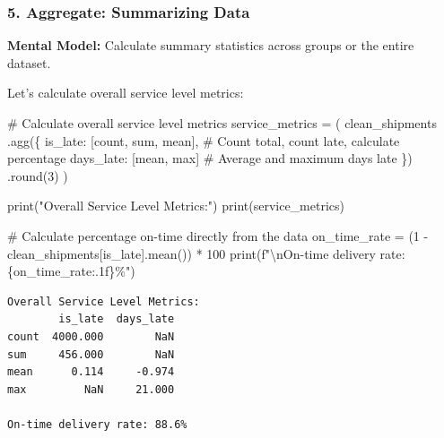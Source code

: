 \documentclass[
  letterpaper,
  DIV=11,
  numbers=noendperiod]{scrartcl}
\newenvironment{Shaded}{\begin{snugshade}}{\end{snugshade}}
\newcommand{\BuiltInTok}[1]{\textcolor[rgb]{0.00,0.23,0.31}{#1}}
\newcommand{\CharTok}[1]{\textcolor[rgb]{0.13,0.47,0.30}{#1}}
\newcommand{\CommentTok}[1]{\textcolor[rgb]{0.37,0.37,0.37}{#1}}
\newcommand{\DecValTok}[1]{\textcolor[rgb]{0.68,0.00,0.00}{#1}}
\newcommand{\NormalTok}[1]{\textcolor[rgb]{0.00,0.23,0.31}{#1}}
\newcommand{\OperatorTok}[1]{\textcolor[rgb]{0.37,0.37,0.37}{#1}}
\newcommand{\SpecialCharTok}[1]{\textcolor[rgb]{0.37,0.37,0.37}{#1}}
\newcommand{\SpecialStringTok}[1]{\textcolor[rgb]{0.13,0.47,0.30}{#1}}
\newcommand{\StringTok}[1]{\textcolor[rgb]{0.13,0.47,0.30}{#1}}
\begin{document}
\subsubsection{5. Aggregate: Summarizing
Data}\label{aggregate-summarizing-data}

\textbf{Mental Model:} Calculate summary statistics across groups or the
entire dataset.

Let's calculate overall service level metrics:

\label{mental-model-5-aggregate}
\begin{Shaded}
\begin{Highlighting}[]
\CommentTok{\# Calculate overall service level metrics}
\NormalTok{service\_metrics }\OperatorTok{=}\NormalTok{ (}
\NormalTok{    clean\_shipments}
\NormalTok{    .agg(\{}
        \StringTok{\textquotesingle{}is\_late\textquotesingle{}}\NormalTok{: [}\StringTok{\textquotesingle{}count\textquotesingle{}}\NormalTok{, }\StringTok{\textquotesingle{}sum\textquotesingle{}}\NormalTok{, }\StringTok{\textquotesingle{}mean\textquotesingle{}}\NormalTok{],  }\CommentTok{\# Count total, count late, calculate percentage}
        \StringTok{\textquotesingle{}days\_late\textquotesingle{}}\NormalTok{: [}\StringTok{\textquotesingle{}mean\textquotesingle{}}\NormalTok{, }\StringTok{\textquotesingle{}max\textquotesingle{}}\NormalTok{]  }\CommentTok{\# Average and maximum days late}
\NormalTok{    \})}
\NormalTok{    .}\BuiltInTok{round}\NormalTok{(}\DecValTok{3}\NormalTok{)}
\NormalTok{)}

\BuiltInTok{print}\NormalTok{(}\StringTok{"Overall Service Level Metrics:"}\NormalTok{)}
\BuiltInTok{print}\NormalTok{(service\_metrics)}

\CommentTok{\# Calculate percentage on{-}time directly from the data}
\NormalTok{on\_time\_rate }\OperatorTok{=}\NormalTok{ (}\DecValTok{1} \OperatorTok{{-}}\NormalTok{ clean\_shipments[}\StringTok{\textquotesingle{}is\_late\textquotesingle{}}\NormalTok{].mean()) }\OperatorTok{*} \DecValTok{100}
\BuiltInTok{print}\NormalTok{(}\SpecialStringTok{f"}\CharTok{\textbackslash{}n}\SpecialStringTok{On{-}time delivery rate: }\SpecialCharTok{\{}\NormalTok{on\_time\_rate}\SpecialCharTok{:.1f\}}\SpecialStringTok{\%"}\NormalTok{)}
\end{Highlighting}
\end{Shaded}

\begin{verbatim}
Overall Service Level Metrics:
        is_late  days_late
count  4000.000        NaN
sum     456.000        NaN
mean      0.114     -0.974
max         NaN     21.000

On-time delivery rate: 88.6%
\end{verbatim}
\end{document}
